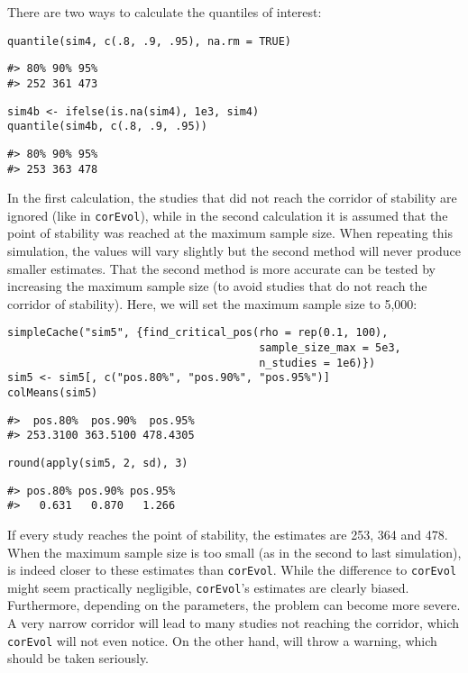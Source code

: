 There are two ways to calculate the quantiles of interest:

\begin{verbatim}
quantile(sim4, c(.8, .9, .95), na.rm = TRUE)
\end{verbatim}

\begin{verbatim}
#> 80% 90% 95% 
#> 252 361 473
\end{verbatim}

\begin{verbatim}
sim4b <- ifelse(is.na(sim4), 1e3, sim4)
quantile(sim4b, c(.8, .9, .95))
\end{verbatim}

\begin{verbatim}
#> 80% 90% 95% 
#> 253 363 478
\end{verbatim}

In the first calculation, the studies that did not reach the corridor of stability are ignored (like in \texttt{corEvol}), while in the second calculation it is assumed that the point of stability was reached at the maximum sample size. When repeating this simulation, the values will vary slightly but the second method will never produce smaller estimates. That the second method is more accurate can be tested by increasing the maximum sample size (to avoid studies that do not reach the corridor of stability). Here, we will set the maximum sample size to 5,000:

\begin{verbatim}
simpleCache("sim5", {find_critical_pos(rho = rep(0.1, 100),
                                       sample_size_max = 5e3,
                                       n_studies = 1e6)})
sim5 <- sim5[, c("pos.80%", "pos.90%", "pos.95%")]
colMeans(sim5)
\end{verbatim}

\begin{verbatim}
#>  pos.80%  pos.90%  pos.95% 
#> 253.3100 363.5100 478.4305
\end{verbatim}

\begin{verbatim}
round(apply(sim5, 2, sd), 3)
\end{verbatim}

\begin{verbatim}
#> pos.80% pos.90% pos.95% 
#>   0.631   0.870   1.266
\end{verbatim}

If every study reaches the point of stability, the estimates are 253, 364 and 478. When the maximum sample size is too small (as in the second to last simulation),  is indeed closer to these estimates than \texttt{corEvol}. While the difference to \texttt{corEvol} might seem practically negligible, \texttt{corEvol}'s estimates are clearly biased. Furthermore, depending on the parameters, the problem can become more severe. A very narrow corridor will lead to many studies not reaching the corridor, which \texttt{corEvol} will not even notice. On the other hand,  will throw a warning, which should be taken seriously.

